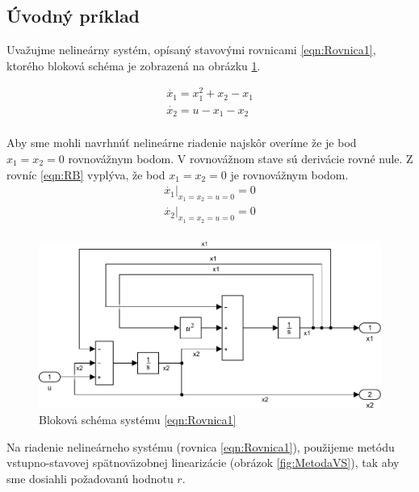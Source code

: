 \documentclass[../main.tex]{subfiles}
\begin{document}
	
\subsection{Úvodný príklad}
Uvažujme nelineárny systém, opísaný stavovými rovnicami \ref{eqn:Rovnica1}, ktorého bloková schéma je zobrazená na obrázku \ref{fig:BlokovaSchemaPr1}. 

\begin{equation}
	\begin{gathered}
	\dot{x_1}  = x_1^2 + x_2 - x_1 \\
	\dot{x_2} = u - x_1 - x_2 \\
	\end{gathered}
	\label{eqn:Rovnica1}
\end{equation}

Aby sme mohli navrhnúť nelineárne riadenie najskôr overíme že je bod  $x_1 = x_2 = 0$ rovnovážnym bodom. V rovnovážnom stave sú derivácie rovné nule. Z rovníc \ref{eqn:RB} vyplýva, že bod $x_1 = x_2 = 0$ je rovnovážnym bodom.
\begin{equation}
\begin{gathered}
\dot{x_1}|_{x_1 = x_2 = u = 0}  =  0 \\
\dot{x_2}|_{x_1 = x_2 = u = 0} = 0 \\
\end{gathered}
\label{eqn:RB}
\end{equation}
	
\begin{figure}[H]
	\begin{center}\includegraphics[scale=0.8]{Rovnica1.pdf}\end{center}
	\caption{Bloková schéma systému \ref{eqn:Rovnica1}}
	\label{fig:BlokovaSchemaPr1}
\end{figure}

Na riadenie nelineárneho systému (rovnica \ref{eqn:Rovnica1}), použijeme metódu vstupno-stavovej spätnoväzobnej linearizácie (obrázok \ref{fig:MetodaVS}), tak aby sme dosiahli požadovanú hodnotu $r$.
\end{document}
